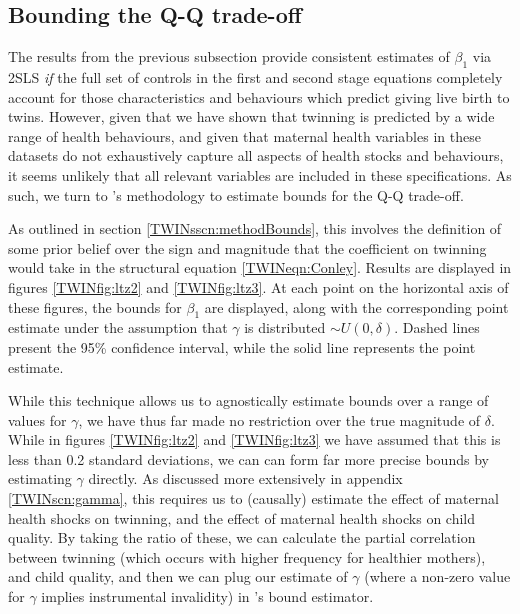 \documentclass[subeqn]{article}
\begin{document}
\begin{spacing}{1.4}


\subsection{Bounding the Q-Q trade-off}            \label{TWINsscn:resultBounds}
The results from the previous subsection provide consistent estimates of 
$\beta_1$ via 2SLS \emph{if} the full set of controls in the first and second 
stage equations completely account for 
those characteristics and behaviours which predict giving live birth to twins. 
However, given that we have shown that twinning is predicted by a wide range of 
health behaviours, and given that maternal health variables in these datasets 
do not exhaustively capture all aspects of health stocks and behaviours, it 
seems unlikely that all relevant variables are included in these specifications. 
As such, we turn to \citeauthor{Conleyetal2012}'s \citeyear{Conleyetal2012} 
methodology to estimate bounds for the Q-Q trade-off.  

As outlined in section \ref{TWINsscn:methodBounds}, this involves the definition 
of some prior belief over the sign and magnitude that the coefficient on 
twinning would take in the structural equation \ref{TWINeqn:Conley}. Results 
are displayed in figures \ref{TWINfig:ltz2} and \ref{TWINfig:ltz3}. At each 
point on the horizontal axis of these figures, the bounds for $\beta_1$ are 
displayed, along with the corresponding point estimate under the assumption 
that $\gamma$ is distributed $\sim U(0,\delta)$. Dashed lines present the 95\% 
confidence interval, while the solid line represents the point estimate.

While this technique allows us to agnostically estimate bounds over a range of
values for $\gamma$, we have thus far made no restriction over the true magnitude
of $\delta$.  While in figures \ref{TWINfig:ltz2} and \ref{TWINfig:ltz3} we
have assumed that this is less than 0.2 standard deviations, we can can form 
far more precise bounds by estimating $\gamma$ directly.  As discussed more 
extensively in appendix \ref{TWINscn:gamma}, this requires us to (causally) 
estimate the effect of maternal health shocks on twinning, and the effect of 
maternal health shocks on child quality.  By taking the ratio of these, we
can calculate the partial correlation between twinning (which occurs with higher 
frequency for healthier mothers), and child quality, and then we can plug 
our estimate of $\gamma$ (where a non-zero value for $\gamma$ implies 
instrumental invalidity) in \citeauthor{Conleyetal2012}'s bound estimator.


\end{spacing}
\end{document}
